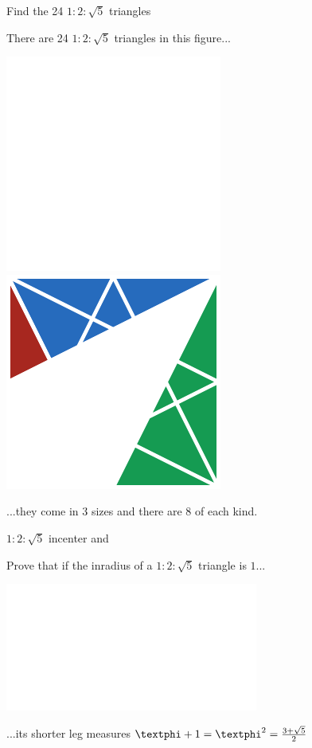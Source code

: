 \documentclass[14pt]{beamer}
\begin{document}
    \begin{frame}{Find the 24 $1\!\!:\!\!2\!\!:\!\!\sqrt{5}$ triangles}
        \begin{center}
            There are 24 $1\!\!:\!\!2\!\!:\!\!\sqrt{5}$ triangles in this figure...

            \bigskip \bigskip

            \includegraphics[height=18ex]{figures/figure002b.pdf}\qquad
            \includegraphics[height=18ex]{figures/figure002d.pdf}\\

            \bigskip \bigskip

            ...they come in 3 sizes and there are 8 of each kind.
        \end{center}
    \end{frame}


    \begin{frame}{$1\!\!:\!\!2\!\!:\!\!\sqrt{5}$ incenter and \textphi}
        \begin{center}
            Prove that if the inradius of a $1\!\!:\!\!2\!\!:\!\!\sqrt{5}$ triangle is $1$...

            \bigskip \bigskip

            \includegraphics[height=18ex]{figures/figure006a.pdf}

            \bigskip \bigskip

            ...its shorter leg measures $\text{\textphi}+1 = \text{\textphi}^2 = \frac{3+\sqrt{5}}{2}$
        \end{center}
    \end{frame}
\end{document}
